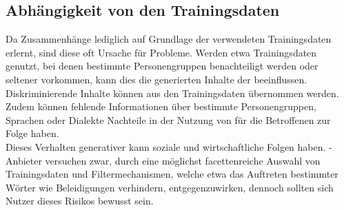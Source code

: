 \documentclass[../main.tex]{subfiles}
\begin{document}
\subsection{Abhängigkeit von den Trainingsdaten}

Da  Zusammenhänge lediglich auf Grundlage der verwendeten Trainingsdaten erlernt, sind diese oft Ursache für Probleme. Werden etwa Trainingsdaten genutzt, 
bei denen bestimmte Personengruppen benachteiligt werden oder seltener vorkommen, kann dies die generierten Inhalte der  beeinflussen. Diskriminierende Inhalte können aus den Trainingsdaten 
übernommen werden. Zudem können fehlende Informationen über bestimmte Personengruppen, Sprachen oder Dialekte Nachteile in der Nutzung von  für die Betroffenen zur Folge haben.\\ 
Dieses Verhalten generativer  kann soziale und wirtschaftliche Folgen haben. -Anbieter versuchen zwar, durch eine möglichst 
facettenreiche Auswahl von Trainingsdaten und Filtermechanismen, welche etwa das Auftreten bestimmter Wörter wie Beleidigungen verhindern, entgegenzuwirken, 
dennoch sollten sich Nutzer dieses Risikos bewusst sein.\\
\end{document}
